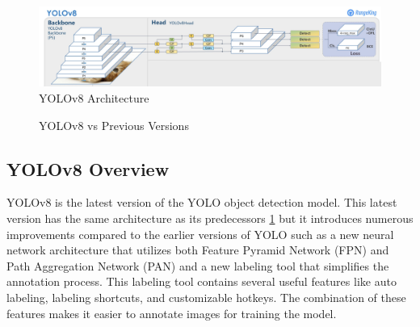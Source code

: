 \documentclass[10pt,twocolumn,letterpaper]{article}
\begin{document}
\begin{figure}[h]
    \centering
    \includegraphics[width=1.0 \textwidth]{figures/YOLOv8_arch.png}
    \caption{YOLOv8 Architecture ~\cite{YOLOv8Website}}
    \label{fig:YOLOv8_arch}
\end{figure}
\begin{figure}[h]
    \centering
    \qquad
    \caption{YOLOv8 vs Previous Versions}%
    \label{fig:Model_Evaluation2}
\end{figure}

\subsection{YOLOv8 Overview}
YOLOv8 is the latest version of the YOLO object detection model. This latest version has the same architecture as its predecessors \ref{fig:YOLOv8_arch} but it introduces numerous improvements compared to the earlier versions of YOLO such as a new neural network architecture that utilizes both Feature Pyramid Network (FPN) and Path Aggregation Network (PAN) and a new labeling tool that simplifies the annotation process. This labeling tool contains several useful features like auto labeling, labeling shortcuts, and customizable hotkeys. The combination of these features makes it easier to annotate images for training the model.
\end{document}
